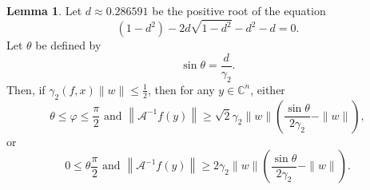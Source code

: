 \documentclass[12pt,oneside,reqno]{amsart}
\theoremstyle{definition}
\newtheorem{lem}[thm]{Lemma}
\begin{document}
\begin{lem}
	Let $d\approx 0.286591$ be the positive root of the equation 
	\begin{equation*}
	(1-d^2)-2d\sqrt{1-d^2}-d^2 -d=0.
	\end{equation*}
	Let $\theta$ be defined by 
	\begin{equation*}
	\sin \theta=\frac{d}{\gamma_2}.
	\end{equation*}
	Then, if $\gamma_2(f,x)\|w\|\leq \frac{1}{2}$, then for any $y\in \mathbb{C}^n$, either
	\[\theta\leq \varphi\leq \frac{\pi}{2}\text{ and }\left\|\mathcal{A}^{-1}f(y)\right\|\geq \sqrt{2}\gamma_2\|w\|\left(\frac{\sin\theta}{2\gamma_2}-\|w\|\right),\]
	or
	\[0\leq \theta \frac{\pi}{2}\text{ and }\left\|\mathcal{A}^{-1}f(y)\right\|\geq 2\gamma_2\|w\|\left(\frac{\sin\theta}{2\gamma_2}-\|w\|\right).\]
\end{lem}


	
\end{document}
